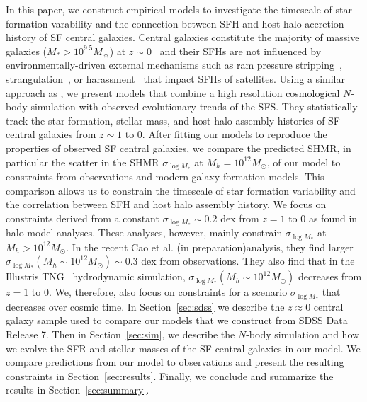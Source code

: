 \documentclass[12pt, letterpaper, preprint, tighten]{aastex62}
\newcommand{\edt}[1]{{\color{dred}{\bf} #1}}
\newcommand{\cao}{Cao et al. (in preparation)}
\newcommand{\siglogm}{\sigma_{\log M_*}}
\begin{document}
\edt{In this paper, we construct empirical models to investigate the timescale
of star formation varability and the connection between SFH and host halo
accretion history of SF central galaxies. 
Central galaxies constitute the majority of massive galaxies ($M_*>10^{9.5}M_\sun$) 
at $z\sim0$~\citep{wetzel2013} and their SFHs are not influenced by 
environmentally-driven external mechanisms such as ram pressure 
stripping~\citep{gunn1972,bekki2009}, strangulation~\citep{larson1980, peng2015}, or 
harassment~\citep{moore1998} that impact SFHs of satellites. 
}
Using a similar approach as \cite{wetzel2013, hahn2017b}, we present models
that combine a high resolution cosmological $N$-body simulation with
observed evolutionary trends of the SFS. They statistically track the 
star formation, stellar mass, and host halo assembly histories of SF central 
galaxies from $z\sim1$ to $0$. 
\edt{After fitting our models to reproduce the properties of observed SF 
central galaxies, we compare the predicted SHMR, in particular the scatter in 
the SHMR $\siglogm$ at $M_h=10^{12}M_\odot$, of our model to constraints from observations 
and modern galaxy formation models. This comparison allows us to constrain 
the timescale of star formation variability and the correlation between SFH 
and host halo assembly history. We focus on constraints derived from a constant 
$\siglogm\sim0.2$ dex from $z=1$ to 0 as found in halo model analyses. 
These analyses, however, mainly constrain $\siglogm$ at $M_h > 10^{12}M_\odot$. 
In the recent \cao analysis, they find larger $\siglogm(M_h\sim 10^{12} M_\odot) \sim 0.3$ 
dex from observations. They also find that in the Illustris TNG~\citep{pillepich2018} 
hydrodynamic simulation, $\siglogm(M_h\sim 10^{12} M_\odot)$ decreases from 
$z=1$ to $0$. We, therefore, also focus on constraints for a scenario 
$\siglogm$ that decreases over cosmic time. 
}
In Section~\ref{sec:sdss} we describe the $z\approx0$ central galaxy
sample 
\edt{used to compare our models} 
that we construct from SDSS Data Release 7. Then in
Section~\ref{sec:sim}, we describe the $N$-body simulation and how we
evolve the SFR and stellar masses of the SF central galaxies
in our model. We compare predictions from our model to observations
and present the resulting constraints in Section~\ref{sec:results}.
Finally, we conclude and summarize the results in Section~\ref{sec:summary}.
\end{document}
